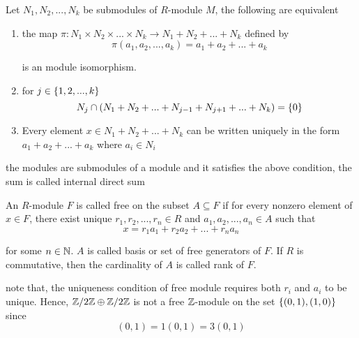 \begin{proposition}
	Let $N_1, N_2, ..., N_k$ be submodules of $R$-module $M$, the following are equivalent
	\begin{enumerate}
		\item the map $\pi: N_1 \times N_2 \times ... \times N_k \to N_1 + N_2 + ... + N_k$ defined by
		$$
			\pi(a_1, a_2, ..., a_k) = a_1 + a_2 + ... + a_k
		$$
		
		is an module isomorphism.
		
		\item for $j \in \{1, 2, ..., k\}$
		$$
			N_j \cap (N_1 + N_2 + ... + N_{j-1} + N_{j+1} + ... + N_k) = \{0\}
		$$
		
		\item Every element $x \in N_1 + N_2 + ... + N_k$ can be written uniquely in the form $a_1 + a_2 + ... + a_k$ where $a_i \in N_i$
	\end{enumerate}
	
\end{proposition}

\begin{remark}
	the modules are submodules of a module and it satisfies the above condition, the sum is called internal direct sum
\end{remark}

\begin{definition}
	An $R$-module $F$ is called free on the subset $A \subseteq F$ if for every nonzero element of $x \in F$, there exist unique $r_1, r_2, ..., r_n \in R$ and $a_1, a_2, ..., a_n \in A$ such that
	$$
		x = r_1 a_1 + r_2 a_2 + ... + r_n a_n
	$$
	
	for some $n \in \mathbb{N}$. $A$ is called basis or set of free generators of $F$. If $R$ is commutative, then the cardinality of $A$ is called rank of $F$.
\end{definition}

\begin{remark}
	note that, the uniqueness condition of free module requires both $r_i$ and $a_i$ to be unique. Hence,  $\mathbb{Z} / 2\mathbb{Z} \oplus \mathbb{Z} / 2\mathbb{Z}$ is not a free $\mathbb{Z}$-module on the set $\{(0, 1), (1, 0)\}$ since
	$$
		(0, 1) = 1 (0, 1) = 3 (0, 1)
	$$
\end{remark}

